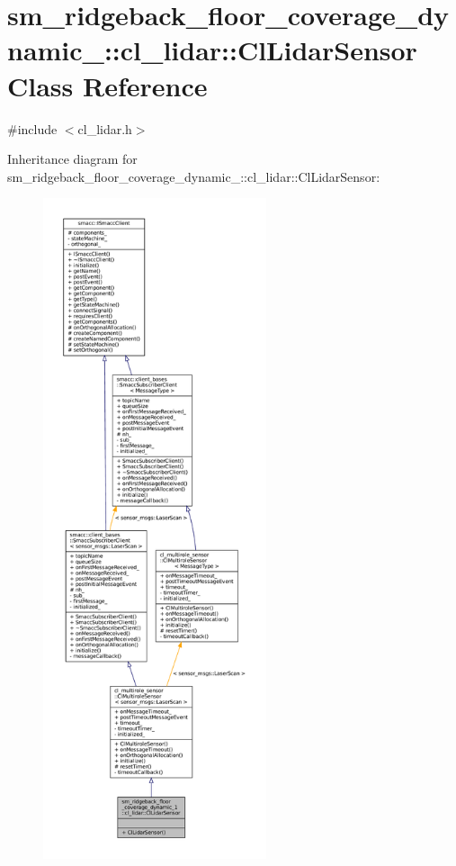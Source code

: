 \hypertarget{classsm__ridgeback__floor__coverage__dynamic__1_1_1cl__lidar_1_1ClLidarSensor}{}\section{sm\+\_\+ridgeback\+\_\+floor\+\_\+coverage\+\_\+dynamic\+\_\+:\+:cl\+\_\+lidar\+:\+:Cl\+Lidar\+Sensor Class Reference}
\label{classsm__ridgeback__floor__coverage__dynamic__1_1_1cl__lidar_1_1ClLidarSensor}


{\ttfamily \#include $<$cl\+\_\+lidar.\+h$>$}



Inheritance diagram for sm\+\_\+ridgeback\+\_\+floor\+\_\+coverage\+\_\+dynamic\+\_\+:\+:cl\+\_\+lidar\+:\+:Cl\+Lidar\+Sensor\+:
\nopagebreak
\begin{figure}[H]
\begin{center}
\leavevmode
\includegraphics[height=550pt]{classsm__ridgeback__floor__coverage__dynamic__1_1_1cl__lidar_1_1ClLidarSensor__inherit__graph}
\end{center}
\end{figure}


